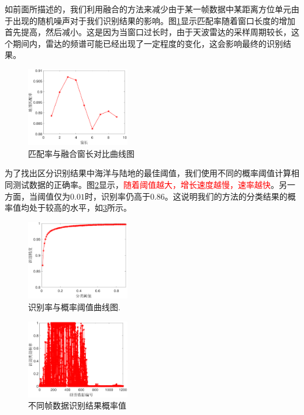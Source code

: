 如前面所描述的，我们利用融合的方法来减少由于某一帧数据中某距离方位单元由于出现的随机噪声对于我们识别结果的影响。图\ref{fig:window}显示匹配率随着窗口长度的增加首先提高，然后减小。这是因为当窗口过长时，由于天波雷达的采样周期较长，这个期间内，雷达的频谱可能已经出现了一定程度的变化，这会影响最终的识别结果。
\begin{figure}[H]
	\centering
	\includegraphics[width=0.4\textwidth]{figures/othr/window}
	\caption{匹配率与融合窗长对比曲线图}
	\label{fig:window}
\end{figure}
为了找出区分识别结果中海洋与陆地的最佳阈值，我们使用不同的概率阈值计算相同测试数据的正确率。图\ref{fig:threshold}显示，\textcolor{red}{随着阈值越大，增长速度越慢，速率越快}。另一方面，当阈值仅为$0.01$时，识别率仍高于$0.86$。这说明我们的方法的分类结果的概率值均处于较高的水平，如\ref{fig:prob}所示。
\begin{figure}[H]
	\centering
	\includegraphics[width=0.4\textwidth]{figures/othr/threashold}
	\caption{识别率与概率阈值曲线图.}
	\label{fig:threshold}
\end{figure}
\begin{figure}[H]
	\centering
	\includegraphics[width=0.4\textwidth]{figures/othr/prob}
	\caption{不同帧数据识别结果概率值}
	\label{fig:prob}
\end{figure}

